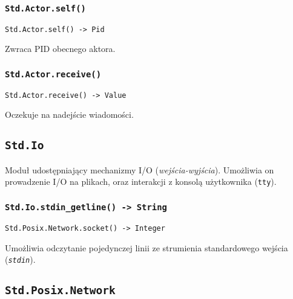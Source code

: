 \subsubsection{\texttt{Std.Actor.self()}}

\begin{small}
\begin{lstlisting}
Std.Actor.self() -> Pid
\end{lstlisting}
\end{small}

Zwraca PID obecnego aktora.

\subsubsection{\texttt{Std.Actor.receive()}}

\begin{small}
\begin{lstlisting}
Std.Actor.receive() -> Value
\end{lstlisting}
\end{small}

Oczekuje na nadejście wiadomości.

\subsection{\texttt{Std.Io}}
\label{stdlib_Std_Io}

Moduł udostępniający mechanizmy I/O (\emph{wejścia-wyjścia}). Umożliwia on prowadzenie I/O na plikach, oraz
interakcji z konsolą użytkownika (\texttt{tty}).

\subsubsection{\texttt{Std.Io.stdin\_getline() -> String}}

\begin{small}
\begin{lstlisting}
Std.Posix.Network.socket() -> Integer
\end{lstlisting}
\end{small}

Umożliwia odczytanie pojedynczej linii ze strumienia standardowego wejścia (\emph{\texttt{stdin}}).

\subsection{\texttt{Std.Posix.Network}}
\label{stdlib_Std_Posix_Network}

